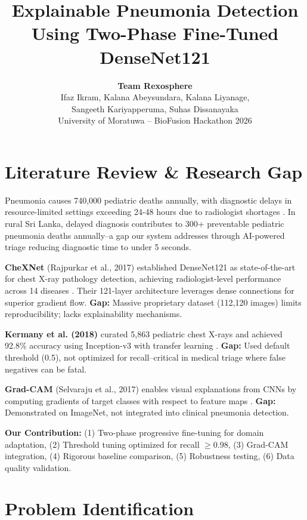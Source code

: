 \documentclass[12pt,a4paper]{article}
\title{\vspace{-1cm}\textbf{Explainable Pneumonia Detection Using Two-Phase Fine-Tuned DenseNet121}\vspace{-0.5cm}}
\author{
\textbf{Team Rexosphere}\\
\small Ifaz Ikram, Kalana Abeysundara, Kalana Liyanage,\\
\small Sangeeth Kariyapperuma, Suhas Dissanayaka\\
\small University of Moratuwa -- BioFusion Hackathon 2026\vspace{-0.5cm}
}
\date{}
\begin{document}
\maketitle

\section{Literature Review \& Research Gap}

Pneumonia causes 740,000 pediatric deaths annually, with diagnostic delays in resource-limited settings exceeding 24-48 hours due to radiologist shortages \cite{who2023}. In rural Sri Lanka, delayed diagnosis contributes to 300+ preventable pediatric pneumonia deaths annually--a gap our system addresses through AI-powered triage reducing diagnostic time to under 5 seconds.

\textbf{CheXNet} (Rajpurkar et al., 2017) established DenseNet121 as state-of-the-art for chest X-ray pathology detection, achieving radiologist-level performance across 14 diseases \cite{rajpurkar2017}. Their 121-layer architecture leverages dense connections for superior gradient flow. \textbf{Gap:} Massive proprietary dataset (112,120 images) limits reproducibility; lacks explainability mechanisms.

\textbf{Kermany et al. (2018)} curated 5,863 pediatric chest X-rays and achieved 92.8\% accuracy using Inception-v3 with transfer learning \cite{kermany2018}. \textbf{Gap:} Used default threshold (0.5), not optimized for recall--critical in medical triage where false negatives can be fatal.

\textbf{Grad-CAM} (Selvaraju et al., 2017) enables visual explanations from CNNs by computing gradients of target classes with respect to feature maps \cite{selvaraju2017}. \textbf{Gap:} Demonstrated on ImageNet, not integrated into clinical pneumonia detection.

\textbf{Our Contribution:} (1) Two-phase progressive fine-tuning for domain adaptation, (2) Threshold tuning optimized for recall $\geq$0.98, (3) Grad-CAM integration, (4) Rigorous baseline comparison, (5) Robustness testing, (6) Data quality validation.

\section{Problem Identification}
\end{document}
